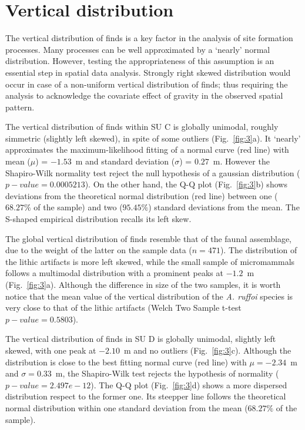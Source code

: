 \documentclass[review,authoryear]{elsarticle} %
\begin{document}
\section{Vertical distribution}

The vertical distribution of finds is a key factor in the analysis of site formation processes. Many processes can be well approximated by a ‘nearly’ normal distribution. However, testing the appropriateness of this assumption is an essential step in spatial data analysis. Strongly right skewed distribution would occur in case of a non-uniform vertical distribution of finds; thus requiring the analysis to acknowledge the covariate effect of gravity in the observed spatial pattern.

The vertical distribution of finds within SU C is globally unimodal, roughly simmetric (slightly left skewed), in spite of some outliers (Fig.~\ref{fig:3}a). It ‘nearly’ approximates the maximum-likelihood fitting of a normal curve (red line) with mean ($\mu$) = $-1.53$~m and standard deviation ($\sigma$) = $0.27$~m. However the Shapiro-Wilk normality test reject the null hypothesis of a gaussian distribution ($p-value=0.0005213$). On the other hand, the Q-Q plot (Fig.~\ref{fig:3}b) shows deviations from the theoretical normal distribution (red line) between one ($68.27\%$ of the sample) and two ($95.45\%$) standard deviations from the mean. The S-shaped empirical distribution recalls its left skew.

The global vertical distribution of finds resemble that of the faunal assemblage, due to the weight of the latter on the sample data ($n=471$). The distribution of the lithic artifacts is more left skewed, while the small sample of micromammals follows a multimodal distribution with a prominent peaks at $-1.2$~m (Fig.~\ref{fig:3}a). Although the difference in size of the two samples, it is worth notice that the mean value of the vertical distribution of the \emph{A. ruffoi} species is very close to that of the lithic artifacts (Welch Two Sample t-test $p-value=0.5803$).

The vertical distribution of finds in SU D is globally unimodal, slightly left skewed, with one peak at $-2.10$~m and no outliers (Fig.~\ref{fig:3}c). Although the distribution is close to the best fitting normal curve (red line) with $\mu=-2.34$~m and $\sigma=0.33$~m, the Shapiro-Wilk test rejects the hypothesis of normality ($p-value=2.497e-12$). The Q-Q plot (Fig.~\ref{fig:3}d) shows a more dispersed distribution respect to the former one. Its steepper line follows the theoretical normal distribution within one standard deviation from the mean ($68.27\%$ of the sample).
\end{document}
